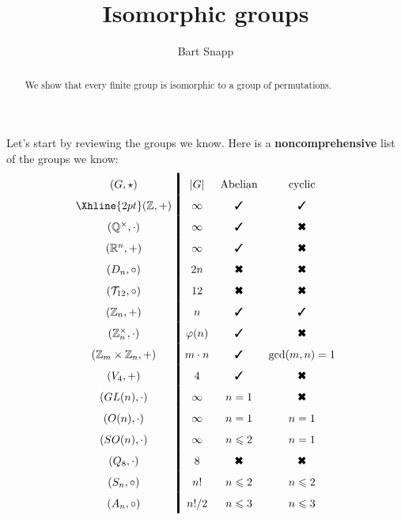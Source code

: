 \documentclass{ximera}
\author{Bart Snapp}
\title{Isomorphic groups}
\begin{document}
\begin{abstract}
  We show that every finite group is isomorphic to a group of
  permutations.
\end{abstract}
\maketitle

Let's start by reviewing the groups we know. Here is a
\textbf{noncomprehensive} list of the groups we know:
\[
\renewcommand{\arraystretch}{1.6}
\begin{array}{c!{\vline width 2pt}cccccc}
  (G,\star)                & |G|           & \text{Abelian}        & \text{cyclic}        \\  \Xhline{2pt}
  (\Z,+)                   & \infty        & \text{\ding{51}}      & \text{\ding{51}}     \\
  (\Q^\times,\cdot)        & \infty        & \text{\ding{51}}      & \text{\ding{54}}     \\
  (\R^n,+)                 & \infty        & \text{\ding{51}}      & \text{\ding{54}}     \\
  (D_n,\circ)              & 2n            & \text{\ding{54}}      & \text{\ding{54}}     \\
  (\mathcal{T}_{12},\circ) & 12            & \text{\ding{54}}      & \text{\ding{54}}     \\
  (\Z_n,+)                 & n             & \text{\ding{51}}      & \text{\ding{51}}     \\
  (\Z_n^\times,\cdot)      & \eulerphi(n)  & \text{\ding{51}}      & \text{\ding{54}}     \\    
  (\Z_m\times \Z_n,+)      & m\cdot n      & \text{\ding{51}}      & \gcd(m,n) = 1        \\
  (V_4,+)                  & 4             & \text{\ding{51}}      & \text{\ding{54}}     \\
  (GL(n),\cdot)            & \infty        & n = 1                 & \text{\ding{54}}     \\
  (O(n),\cdot)             & \infty        & n = 1                 & n=1                  \\
  (SO(n),\cdot)            & \infty        & n\le 2                & n=1                  \\
  (Q_8,\cdot)              & 8             & \text{\ding{54}}      & \text{\ding{54}}     \\
  (S_n,\circ)              & n!            & n\le 2                & n\le 2               \\
  (A_n,\circ)              & n!/2          & n\le 3                & n\le 3               \\
\end{array}
\]
\end{document}
